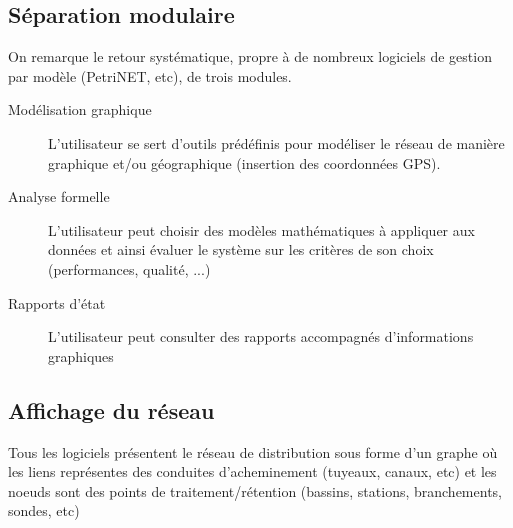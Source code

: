 \documentclass[a4paper, 11pt]{article}
\begin{document}
\subsection{Séparation modulaire}
On remarque le retour systématique, propre à de nombreux logiciels de gestion par modèle (PetriNET, etc), de trois modules.
\begin{description}
    \item[Modélisation graphique] L'utilisateur se sert d'outils prédéfinis pour modéliser le réseau de manière graphique et/ou géographique (insertion des coordonnées GPS).
    \item[Analyse formelle] L'utilisateur peut choisir des modèles mathématiques à appliquer aux données et ainsi évaluer le système sur les critères de son choix (performances, qualité, ...)
    \item[Rapports d'état] L'utilisateur peut consulter des rapports accompagnés d'informations graphiques
\end{description}

\subsection{Affichage du réseau}
Tous les logiciels présentent le réseau de distribution sous forme d'un graphe où les liens représentes des conduites d'acheminement (tuyeaux, canaux, etc) et les noeuds sont des points de traitement/rétention (bassins, stations, branchements, sondes, etc)
\end{document}
